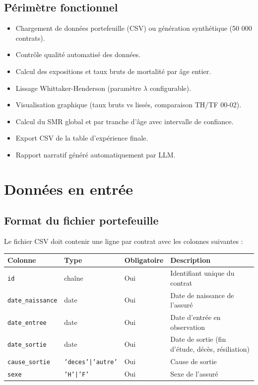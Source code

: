 \documentclass[11pt,a4paper]{article}
\begin{document}
\subsection{Périmètre fonctionnel}
\begin{itemize}
  \item Chargement de données portefeuille (CSV) ou génération synthétique (50 000 contrats).
  \item Contrôle qualité automatisé des données.
  \item Calcul des expositions et taux bruts de mortalité par âge entier.
  \item Lissage Whittaker-Henderson (paramètre $\lambda$ configurable).
  \item Visualisation graphique (taux bruts vs lissés, comparaison TH/TF 00-02).
  \item Calcul du SMR global et par tranche d'âge avec intervalle de confiance.
  \item Export CSV de la table d'expérience finale.
  \item Rapport narratif généré automatiquement par LLM.
\end{itemize}

\section{Données en entrée}

\subsection{Format du fichier portefeuille}
Le fichier CSV doit contenir une ligne par contrat avec les colonnes suivantes :

\begin{center}
\begin{tabular}{llll}
\toprule
\textbf{Colonne} & \textbf{Type} & \textbf{Obligatoire} & \textbf{Description} \\
\midrule
\texttt{id} & chaîne & Oui & Identifiant unique du contrat \\
\texttt{date\_naissance} & date & Oui & Date de naissance de l'assuré \\
\texttt{date\_entree} & date & Oui & Date d'entrée en observation \\
\texttt{date\_sortie} & date & Oui & Date de sortie (fin d'étude, décès, résiliation) \\
\texttt{cause\_sortie} & \texttt{'deces'|\!'autre'} & Oui & Cause de sortie \\
\texttt{sexe} & \texttt{'H'|\!'F'} & Oui & Sexe de l'assuré \\
\bottomrule
\end{tabular}
\end{center}
\end{document}
